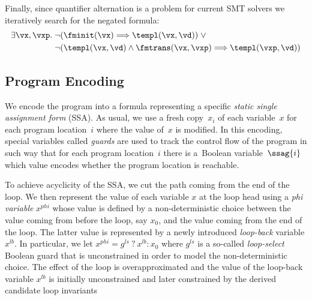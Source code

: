 {Finally, since quantifier alternation is a problem for current SMT solvers
we iteratively search for the negated formula:
\begin{equation}\label{eq:templ_neg}
\begin{split}
\exists \vx, \vxp .\; &
    \neg (\fminit(\vx) \Longrightarrow \templ(\vx, \vd)) \; \vee \\
& \neg (\templ(\vx, \vd) \wedge \fmtrans(\vx,\vxp) \Longrightarrow \templ(\vxp, \vd))
\end{split}
\end{equation}

\subsection{Program Encoding}
We encode the program into a formula representing a specific \emph{static single assignment form} (SSA).
As usual, we use a fresh copy~$x_i$ of each variable~$x$ for each program location~$i$
where the value of~$x$ is modified.
In this encoding, special variables called \emph{guards} are used to track the control flow of the program
in such way that for each program location~$i$ there is a~Boolean variable~$\ssag{i}$ which value
encodes whether the program location is reachable.

To achieve acyclicity of the SSA, we cut the path coming from the end of the loop.
We then represent the value of each variable $x$ at the loop head using a
\emph{phi variable} $x^{phi}$ whose value is defined by a non-deterministic
choice between the value coming from before the loop, say $x_0$, and the
value coming from the end of the loop. The latter value is represented by a
newly introduced \emph{loop-back} variable $x^{lb}$. In particular, we let
$x^{phi} = g^{ls} ~?~ x^{lb} : x_0$ where $g^{ls}$ is a so-called
\emph{loop-select} Boolean guard that is unconstrained in order to model the
non-deterministic choice. 
The effect of the loop is overapproximated and 
the value of the loop-back variable $x^{lb}$ is initially unconstrained
and later constrained by the derived candidate loop invariants

}
